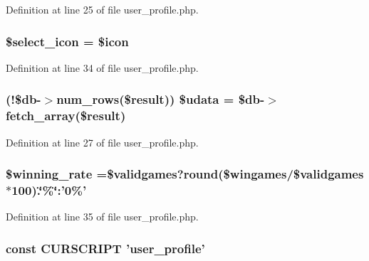 Definition at line 25 of file user\+\_\+profile.\+php.

\hypertarget{user__profile_8php_a18d851a26297fb49eda4d94e0605ba05}{
\subsubsection[{\$select\+\_\+icon}]{\setlength{\rightskip}{0pt plus 5cm}\$select\+\_\+icon = \$icon}}\label{user__profile_8php_a18d851a26297fb49eda4d94e0605ba05}


Definition at line 34 of file user\+\_\+profile.\+php.

\hypertarget{user__profile_8php_aa64a6e7c321a5fc5c5089fc201f285cb}{
\subsubsection[{\$udata}]{ (!\$db-\/$>$num\+\_\+rows(\${\bf result})) \$udata = \$db-\/$>$fetch\+\_\+array(\${\bf result})}}\label{user__profile_8php_aa64a6e7c321a5fc5c5089fc201f285cb}


Definition at line 27 of file user\+\_\+profile.\+php.

\hypertarget{user__profile_8php_ad82881aa9b7ef451f827d30a6f85b152}{
\subsubsection[{\$winning\+\_\+rate}]{\setlength{\rightskip}{0pt plus 5cm}\$winning\+\_\+rate =\$validgames?round(\$wingames/\$validgames$\ast$100).\char`\"{}\%\char`\"{}\+:'0\%'}}\label{user__profile_8php_ad82881aa9b7ef451f827d30a6f85b152}


Definition at line 35 of file user\+\_\+profile.\+php.

\hypertarget{user__profile_8php_a39c39f525eceb86cabc338804f230e80}{
\subsubsection[{C\+U\+R\+S\+C\+R\+I\+P\+T}]{\setlength{\rightskip}{0pt plus 5cm}const C\+U\+R\+S\+C\+R\+I\+P\+T 'user\+\_\+profile'}}\label{user__profile_8php_a39c39f525eceb86cabc338804f230e80}


